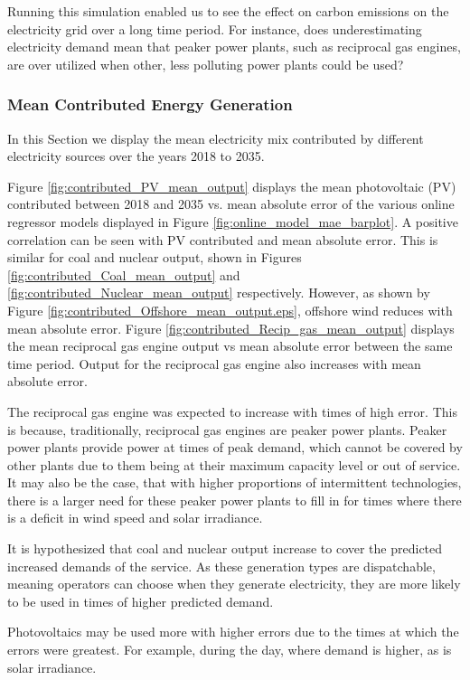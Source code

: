 \documentclass[final,3p,times,twocolumn,numbers]{elsarticle}
\begin{document}
Running this simulation enabled us to see the effect on carbon emissions on the electricity grid over a long time period. For instance, does underestimating electricity demand mean that peaker power plants, such as reciprocal gas engines, are over utilized when other, less polluting power plants could be used?



\subsubsection{Mean Contributed Energy Generation}


In this Section we display the mean electricity mix contributed by different electricity sources over the years 2018 to 2035. 

Figure \ref{fig:contributed_PV_mean_output} displays the mean photovoltaic (PV) contributed between 2018 and 2035 vs. mean absolute error of the various online regressor models displayed in Figure \ref{fig:online_model_mae_barplot}. A positive correlation can be seen with PV contributed and mean absolute error. This is similar for coal and nuclear output, shown in Figures \ref{fig:contributed_Coal_mean_output} and \ref{fig:contributed_Nuclear_mean_output} respectively. However, as shown by Figure \ref{fig:contributed_Offshore_mean_output.eps}, offshore wind reduces with mean absolute error. Figure \ref{fig:contributed_Recip_gas_mean_output} displays the mean reciprocal gas engine output vs mean absolute error between the same time period. Output for the reciprocal gas engine also increases with mean absolute error.

The reciprocal gas engine was expected to increase with times of high error. This is because, traditionally, reciprocal gas engines are peaker power plants. Peaker power plants provide power at times of peak demand, which cannot be covered by other plants due to them being at their maximum capacity level or out of service. It may also be the case, that with higher proportions of intermittent technologies, there is a larger need for these peaker power plants to fill in for times where there is a deficit in wind speed and solar irradiance.

It is hypothesized that coal and nuclear output increase to cover the predicted increased demands of the service. As these generation types are dispatchable, meaning operators can choose when they generate electricity, they are more likely to be used in times of higher predicted demand.

Photovoltaics may be used more with higher errors due to the times at which the errors were greatest. For example, during the day, where demand is higher, as is solar irradiance.
\end{document}
